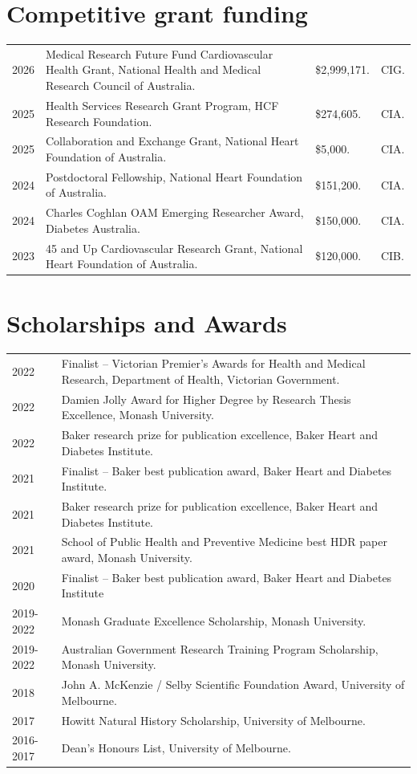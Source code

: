 \documentclass[11pt]{article}
\begin{document}
\section*{Competitive grant funding}
\begin{tabular}{p{2cm}p{11cm}p{2cm}p{1cm}}
2026 & Medical Research Future Fund Cardiovascular Health Grant, National Health and Medical Research Council of Australia. & \$2,999,171. & CIG. \\
2025 & Health Services Research Grant Program, HCF Research Foundation. & \$274,605. & CIA. \\
2025 & Collaboration and Exchange Grant, National Heart Foundation of Australia. & \$5,000. & CIA. \\
2024 & Postdoctoral Fellowship, National Heart Foundation of Australia. & \$151,200. & CIA. \\
2024 & Charles Coghlan OAM Emerging Researcher Award, Diabetes Australia. & \$150,000. & CIA. \\
2023 & 45 and Up Cardiovascular Research Grant, National Heart Foundation of Australia. & \$120,000. & CIB. \\
\end{tabular}

\section*{Scholarships and Awards}
\begin{tabular}{p{2cm}p{14cm}}
2022 & Finalist – Victorian Premier's Awards for Health and Medical Research, Department of Health, Victorian Government. \\
2022 & Damien Jolly Award for Higher Degree by Research Thesis Excellence, Monash University. \\
2022 & Baker research prize for publication excellence, Baker Heart and Diabetes Institute. \\
2021 & Finalist – Baker best publication award, Baker Heart and Diabetes Institute. \\
2021 & Baker research prize for publication excellence, Baker Heart and Diabetes Institute. \\
2021 & School of Public Health and Preventive Medicine best HDR paper award, Monash University. \\
2020 & Finalist – Baker best publication award, Baker Heart and Diabetes Institute \\
2019-2022 & Monash Graduate Excellence Scholarship, Monash University. \\
2019-2022 & Australian Government Research Training Program Scholarship, Monash University. \\
2018 & John A. McKenzie / Selby Scientific Foundation Award, University of Melbourne. \\
2017 & Howitt Natural History Scholarship, University of Melbourne. \\
2016-2017 & Dean's Honours List, University of Melbourne. \\
\end{tabular}
\end{document}

